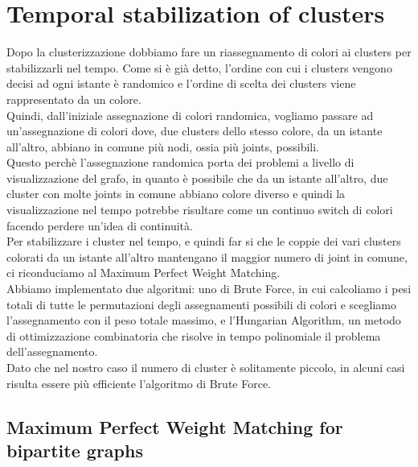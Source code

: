\section{Temporal stabilization of clusters}

Dopo la clusterizzazione dobbiamo fare un riassegnamento di colori ai clusters per stabilizzarli nel tempo.
Come si è già detto, l'ordine con cui i clusters vengono decisi ad ogni istante è randomico e l'ordine di scelta dei clusters viene rappresentato da un colore. \\
Quindi, dall'iniziale assegnazione di colori randomica, vogliamo passare ad un'assegnazione di colori dove, due clusters dello stesso colore, da un istante all'altro, abbiano in comune più nodi, ossia più joints, possibili. \\
Questo perchè l'assegnazione randomica porta dei problemi a livello di visualizzazione del grafo, in quanto è possibile che da un istante all'altro, due cluster con molte joints in comune abbiano colore diverso e quindi la visualizzazione nel tempo potrebbe risultare come un continuo switch di colori facendo perdere un'idea di continuità.
\\

Per stabilizzare i cluster nel tempo, e quindi far si che le coppie dei vari clusters colorati da un istante all'altro mantengano il maggior numero di joint in comune, ci riconduciamo al Maximum Perfect Weight Matching. \\     
Abbiamo implementato due algoritmi: uno di Brute Force, in cui calcoliamo i pesi totali di tutte le permutazioni degli assegnamenti possibili di colori e scegliamo l'assegnamento con il peso totale massimo, e l'Hungarian Algorithm, un metodo di ottimizzazione combinatoria che risolve in tempo polinomiale il problema dell'assegnamento. \\
Dato che nel nostro caso il numero di cluster è solitamente piccolo, in alcuni casi risulta essere più efficiente l'algoritmo di Brute Force.

\subsection{Maximum Perfect Weight Matching for bipartite graphs}

